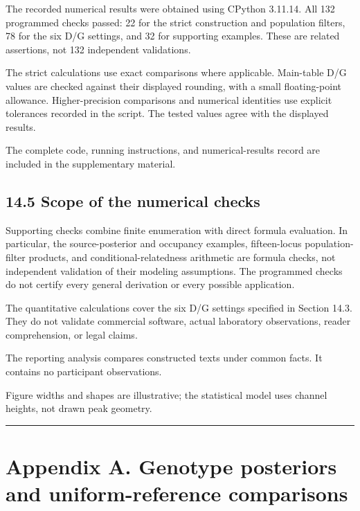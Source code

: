 \documentclass[
]{article}
\begin{document}
The recorded numerical results were obtained using CPython 3.11.14. All
132 programmed checks passed: 22 for the strict construction and
population filters, 78 for the six D/G settings, and 32 for supporting
examples. These are related assertions, not 132 independent validations.

The strict calculations use exact comparisons where applicable.
Main-table D/G values are checked against their displayed rounding, with
a small floating-point allowance. Higher-precision comparisons and
numerical identities use explicit tolerances recorded in the script. The
tested values agree with the displayed results.

The complete code, running instructions, and numerical-results record
are included in the supplementary material.

\subsection{14.5 Scope of the numerical
checks}\label{scope-of-the-numerical-checks}

Supporting checks combine finite enumeration with direct formula
evaluation. In particular, the source-posterior and occupancy examples,
fifteen-locus population-filter products, and conditional-relatedness
arithmetic are formula checks, not independent validation of their
modeling assumptions. The programmed checks do not certify every general
derivation or every possible application.

The quantitative calculations cover the six D/G settings specified in
Section 14.3. They do not validate commercial software, actual
laboratory observations, reader comprehension, or legal claims.

The reporting analysis compares constructed texts under common facts. It
contains no participant observations.

Figure widths and shapes are illustrative; the statistical model uses
channel heights, not drawn peak geometry.

\begin{center}\rule{0.5\linewidth}{0.5pt}\end{center}

\section{Appendix A. Genotype posteriors and uniform-reference
comparisons}\label{appendix-a.-genotype-posteriors-and-uniform-reference-comparisons}
\end{document}
